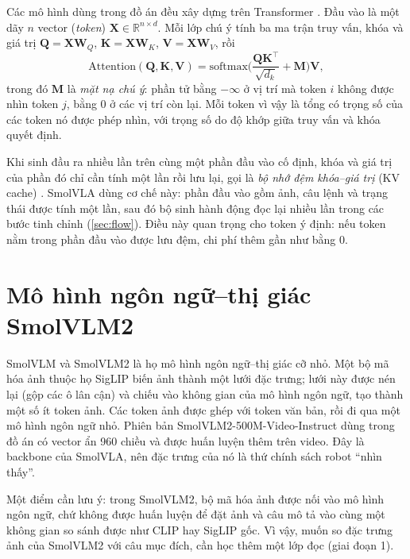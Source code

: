 \documentclass[a4paper,oneside]{report}
\newcommand{\R}{\mathbb{R}}
\begin{document}
Các mô hình dùng trong đồ án đều xây dựng trên Transformer \citep{vaswani2017attention}. Đầu vào là một dãy $n$ vector (\textit{token}) $\mathbf{X}\in\R^{n\times d}$. Mỗi lớp chú ý tính ba ma trận truy vấn, khóa và giá trị $\mathbf{Q}=\mathbf{X}\mathbf{W}_Q$, $\mathbf{K}=\mathbf{X}\mathbf{W}_K$, $\mathbf{V}=\mathbf{X}\mathbf{W}_V$, rồi
\begin{equation}
  \mathrm{Attention}(\mathbf{Q},\mathbf{K},\mathbf{V}) = \mathrm{softmax}\!\Big(\frac{\mathbf{Q}\mathbf{K}^\top}{\sqrt{d_k}} + \mathbf{M}\Big)\mathbf{V},
  \label{eq:attention}
\end{equation}
trong đó $\mathbf{M}$ là \textit{mặt nạ chú ý}: phần tử bằng $-\infty$ ở vị trí mà token $i$ không được nhìn token $j$, bằng 0 ở các vị trí còn lại. Mỗi token vì vậy là tổng có trọng số của các token nó được phép nhìn, với trọng số do độ khớp giữa truy vấn và khóa quyết định.

Khi sinh đầu ra nhiều lần trên cùng một phần đầu vào cố định, khóa và giá trị của phần đó chỉ cần tính một lần rồi lưu lại, gọi là \textit{bộ nhớ đệm khóa--giá trị} (KV cache) \citep{pope2023efficiently}. SmolVLA dùng cơ chế này: phần đầu vào gồm ảnh, câu lệnh và trạng thái được tính một lần, sau đó bộ sinh hành động đọc lại nhiều lần trong các bước tinh chỉnh (\cref{sec:flow}). Điều này quan trọng cho token ý định: nếu token nằm trong phần đầu vào được lưu đệm, chi phí thêm gần như bằng 0.

\section{Mô hình ngôn ngữ--thị giác SmolVLM2}
\label{sec:smolvlm}

SmolVLM \citep{marafioti2025smolvlm} và SmolVLM2 \citep{huggingface2025smolvlm2} là họ mô hình ngôn ngữ--thị giác cỡ nhỏ. Một bộ mã hóa ảnh thuộc họ SigLIP \citep{zhai2023siglip} biến ảnh thành một lưới đặc trưng; lưới này được nén lại (gộp các ô lân cận) và chiếu vào không gian của mô hình ngôn ngữ, tạo thành một số ít token ảnh. Các token ảnh được ghép với token văn bản, rồi đi qua một mô hình ngôn ngữ nhỏ. Phiên bản SmolVLM2-500M-Video-Instruct dùng trong đồ án có vector ẩn 960 chiều và được huấn luyện thêm trên video. Đây là backbone của SmolVLA, nên đặc trưng của nó là thứ chính sách robot ``nhìn thấy''.

Một điểm cần lưu ý: trong SmolVLM2, bộ mã hóa ảnh được nối vào mô hình ngôn ngữ, chứ không được huấn luyện để đặt ảnh và câu mô tả vào cùng một không gian so sánh được như CLIP hay SigLIP gốc. Vì vậy, muốn so đặc trưng ảnh của SmolVLM2 với câu mục đích, cần học thêm một lớp đọc (giai đoạn 1).
\end{document}
